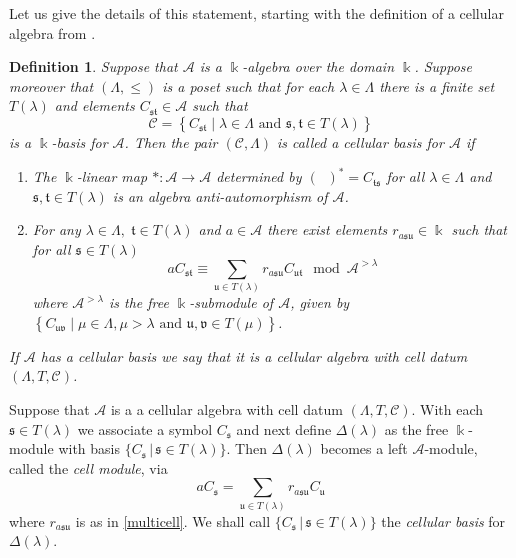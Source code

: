 \documentclass[10pt,hidelinks]{article}
\newcommand{\PP}{\Lambda }
\newcommand{\s}{\mathfrak{s}}
\newcommand{\V}{\mathfrak{v}}
\newcommand{\T}{  \mathfrak{t}}
\newcommand{\U}{  \mathfrak{u}}
\newtheorem{definition}[theorem]{Definition}
\numberwithin{equation}{section}
\begin{document}
\medskip
Let us give the details of this statement, starting with the definition of a cellular algebra from \cite{GL}. 
\begin{definition}{\label{cellular}} Suppose that $\mathcal{A}$ is a
  $\Bbbk $-algebra over the domain $ \Bbbk $. Suppose moreover that $(\PP,\leq)$ is a poset
  such that for each $\lambda\in \PP$ there is a
finite set $T(\lambda)$ and elements $C_{\s\T}\in \mathcal{A}$ such that
\begin{equation}
  \mathcal{C}=\left\{C_{\s\T}\mid \lambda\in \PP \mbox{ and } \s,\T\in T(\lambda)\right\}
\end{equation}  
is a $\Bbbk$-basis for $\mathcal{A} $. Then the pair $(\mathcal{C},\PP)$ is called a 
\textit{cellular basis} for $\mathcal{A}$ if
\begin{enumerate}\renewcommand{\labelenumi}{\textbf{(\roman{enumi})}}
\item The $\Bbbk$-linear map $*:\mathcal{A}\to \mathcal{A}$ determined by
$(\mathop{C_{\s\T}})^*=C_{\T\s}$ for all
$\lambda\in\PP$ and $\s,\T\in T(\lambda)$ is an algebra
anti-automorphism of $\mathcal A$.

\item For any $\lambda\in \PP,\; \T\in T(\lambda)$ and $a\in \mathcal{A}$
there exist elements $ r_{a \s \U} \in \Bbbk$ such that for all $\s\in T(\lambda)$
\begin{equation}\label{multicell}
  a C_{\s\T}  \equiv \sum_{\U\in T(\lambda)} r_{a \s \U}C_{\U\T} \mod{\mathcal{A}^{> \lambda}}
  \end{equation}
where $\mathcal{A}^{    >\lambda} $ is the free $\Bbbk$-submodule of $\mathcal{A}$, given by 
$\left\{C_{\U\V}\mid \mu\in \PP,\mu>\lambda \mbox{ and }
\U,\V\in T(\mu)\right\}$.
\end{enumerate}
If $\mathcal A$ has a cellular basis we say that it is a \textit{cellular
algebra} with \textit{cell datum} $(\PP,T,\mathcal{C})$.
\end{definition}

Suppose that $\mathcal A$ is a a cellular algebra with cell datum $(\PP,T,\mathcal{C})$.
With each $ \s \in T(\lambda) $ we associate a symbol $ C_{\s} $ and next define
$ \Delta(\lambda) $ as the free $  \Bbbk $-module with basis $ \{ C_{\s} \,| \, \s \in T(\lambda) \} $. 
Then $ \Delta(\lambda) $ becomes a left $ \mathcal A$-module, called the {\it cell module}, via
\begin{equation}
a C_{\s} = \sum_{\U\in T(\lambda)} r_{a \s \U}C_{\U}
\end{equation}  
where $ r_{a \s \U} $ is as in \eqref{multicell}. We shall call $ \{ C_{\s} \, | \, \s \in T(\lambda) \} $
the {\it cellular basis} for $ \Delta(\lambda) $. 
\end{document}
